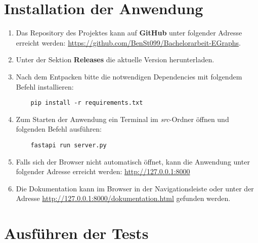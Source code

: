 \section{Installation der Anwendung}\label{sec:installation}

\begin{enumerate}
  \item Das Repository des Projektes kann auf \textbf{GitHub} unter folgender Adresse erreicht werden: \url{https://github.com/BenSt099/Bachelorarbeit-EGraphs}.
  \item Unter der Sektion \textbf{Releases} die aktuelle Version herunterladen.
  \item Nach dem Entpacken bitte die notwendigen Dependencies mit folgendem Befehl installieren:
  
  \begin{verbatim}
    pip install -r requirements.txt
  \end{verbatim}

  \item Zum Starten der Anwendung ein Terminal im \textit{src}-Ordner öffnen und folgenden Befehl ausführen:

  \begin{verbatim}
    fastapi run server.py
  \end{verbatim}
  
  \item Falls sich der Browser nicht automatisch öffnet, kann die Anwendung unter folgender Adresse erreicht werden:
  \url{http://127.0.0.1:8000}
  \item Die Dokumentation kann im Browser in der Navigationsleiste oder unter der Adresse \url{http://127.0.0.1:8000/dokumentation.html} gefunden werden.
\end{enumerate}

\section{Ausführen der Tests}


